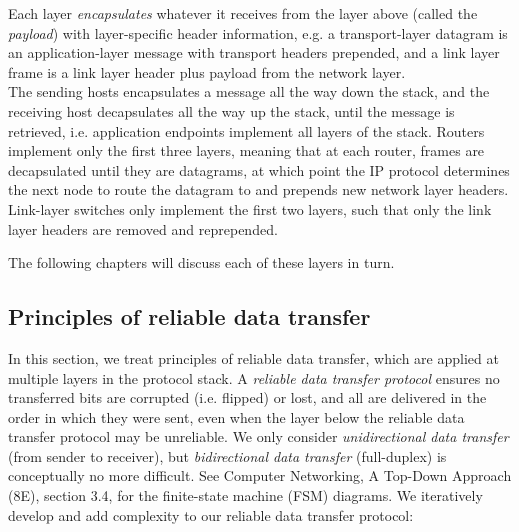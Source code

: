 \documentclass[table, xcdraw]{article}%
\begin{document}
Each layer \emph{encapsulates} whatever it receives from the layer above (called the \emph{payload}) with layer-specific header information, e.g. a transport-layer datagram is an application-layer message with transport headers prepended, and a link layer frame is a link layer header plus payload from the network layer.\\
The sending hosts encapsulates a message all the way down the stack, and the receiving host decapsulates all the way up the stack, until the message is retrieved, i.e. application endpoints implement all layers of the stack. Routers implement only the first three layers, meaning that at each router, frames are decapsulated until they are datagrams, at which point the IP protocol determines the next node to route the datagram to and prepends new network layer headers. Link-layer switches only implement the first two layers, such that only the link layer headers are removed and reprepended.

The following chapters will discuss each of these layers in turn.

\subsection{Principles of reliable data transfer} \label{reliabledatatransfer}

In this section, we treat principles of reliable data transfer, which are applied at multiple layers in the protocol stack. A \emph{reliable data transfer protocol} ensures no transferred bits are corrupted (i.e. flipped) or lost, and all are delivered in the order in which they were sent, even when the layer below the reliable data transfer protocol may be unreliable. We only consider \emph{unidirectional data transfer} (from sender to receiver), but \emph{bidirectional data transfer} (full-duplex) is conceptually no more difficult. See Computer Networking, A Top-Down Approach (8E), section 3.4, for the finite-state machine (FSM) diagrams. We iteratively develop and add complexity to our reliable data transfer protocol:
\end{document}
